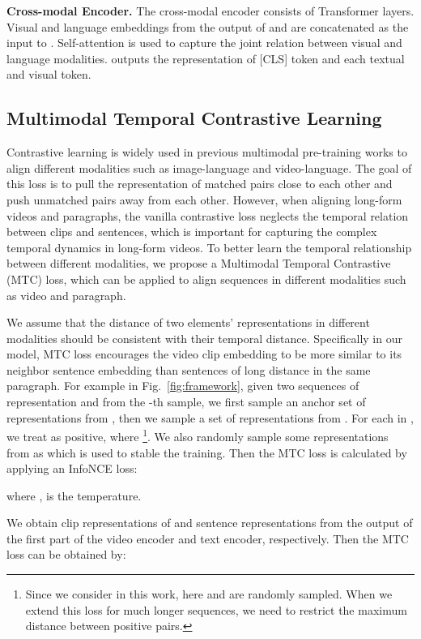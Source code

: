 \documentclass{article}
\begin{document}
\textbf{Cross-modal Encoder.}
The cross-modal encoder  consists of Transformer layers. Visual and language embeddings from the output of  and  are concatenated as the input to . Self-attention is used to capture the joint relation between visual and language modalities.  outputs the representation of [CLS] token and each textual and visual token.

\subsection{Multimodal Temporal Contrastive Learning}\label{mtcl}
Contrastive learning is widely used in previous multimodal pre-training works to align different modalities such as image-language and video-language. 
The goal of this loss is to pull the representation of matched pairs close to each other and push unmatched pairs away from each other.
However, when aligning long-form videos and paragraphs, the vanilla contrastive loss neglects the temporal relation between clips and sentences, which is important for capturing the complex temporal dynamics in long-form videos.
To better learn the temporal relationship between different modalities, we propose a Multimodal Temporal Contrastive (MTC) loss, which can be applied to align sequences in different modalities such as video and paragraph.  

We assume that the distance of two elements' representations in different modalities should be consistent with their temporal distance. Specifically in our model, MTC loss encourages the video clip embedding to be more similar to its neighbor sentence embedding than sentences of long distance in the same paragraph.
For example in Fig.~\ref{fig:framework}, 
given two sequences of representation  and  from the -th sample, we first sample an anchor set  of  representations from , then we sample a set of representations  from . For each  in , we treat  as positive, where  \footnote{Since we consider  in this work, here  and  are randomly sampled. When we extend this loss for much longer sequences, we need to restrict the maximum distance between positive pairs.}. We also randomly sample some representations from  as  which is used to stable the training. Then the MTC loss is calculated by applying an InfoNCE loss:





where ,  is the temperature.

We obtain clip representations of  and sentence representations  from the output of the first part of the video encoder and text encoder, respectively. Then the MTC loss can be obtained by:
\end{document}
